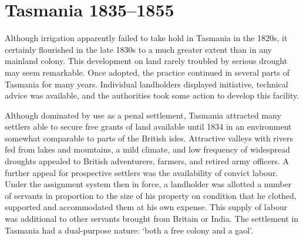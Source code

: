 
\setcounter{endnote}{0}

\chapter{Tasmania 1835--1855}

Although irrigation apparently failed to take hold in Tasmania in the
1820s, it certainly flourished in the late 1830s to a much greater
extent than in any mainland colony.  This development on land rarely
troubled by serious drought may seem remarkable.  Once adopted, the
practice continued in several parts of Tasmania for many years.
Individual landholders displayed initiative, technical advice was
available, and the authorities took some action to develop this
facility.

Although dominated by use as a penal settlement, Tasmania attracted
many settlers able to secure free grants of land available until 1834
in an environment somewhat comparable to parts of the British
isles.  Attractive valleys with rivers fed from
lakes and mountains, a mild climate, and low frequency of widespread
droughts appealed to British adventurers, farmers, and retired army
officers.  A further appeal for prospective settlers was the
availability of convict labour.  Under the assignment system then in
force, a landholder was allotted a number of servants in proportion to
the size of his property on condition that he clothed, supported and
accommodated them at his own expense.  This supply of labour was
additional to other servants brought from Britain or India. The
settlement in Tasmania had a dual-purpose nature: `both a free colony
and a gaol'.

